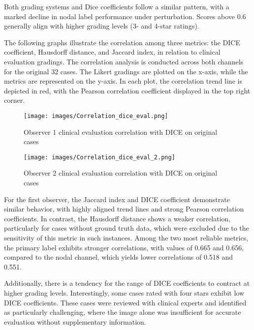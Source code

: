 Both grading systems and Dice coefficients follow a similar pattern, with a marked decline in nodal label performance under perturbation. Scores above 0.6 generally align with higher grading levels (3- and 4-star ratings).

\newpage
The following graphs illustrate the correlation among three metrics: the DICE coefficient, Hausdorff distance, and Jaccard index, 
in relation to clinical evaluation gradings. The correlation analysis is conducted across both channels for the original 32 cases. 
The Likert gradings are plotted on the x-axis, while the metrics are represented on the y-axis. In each plot, the correlation trend 
line is depicted in red, with the Pearson correlation coefficient displayed in the top right corner.

\begin{figure}[ht]
    \centering
    \texttt{[image: images/Correlation\_dice\_eval.png]}
    \caption{Observer 1 clinical evaluation correlation with DICE on original cases}
    \label{fig:three_subfigures}
\end{figure}

\begin{figure}[ht]
    \centering
    \texttt{[image: images/Correlation\_dice\_eval\_2.png]}
    \caption{Observer 2 clinical evaluation correlation with DICE on original cases}
    \label{fig:three_subfigures}
\end{figure}
\newpage
For the first observer, the Jaccard index and DICE coefficient demonstrate similar behavior, with highly aligned trend lines and strong Pearson correlation coefficients. In contrast, the Hausdorff distance shows a weaker correlation, particularly for cases without ground truth data, which were excluded due to the sensitivity of this metric in such instances. Among the two most reliable metrics, the primary label exhibits stronger correlations, with values of 0.665 and 0.656, compared to the nodal channel, which yields lower correlations of 0.518 and 0.551.

Additionally, there is a tendency for the range of DICE coefficients to contract at higher grading levels. Interestingly, some cases rated with four stars exhibit low DICE coefficients. These cases were reviewed with clinical experts and identified as particularly challenging, where the image alone was insufficient for accurate evaluation without supplementary information.

